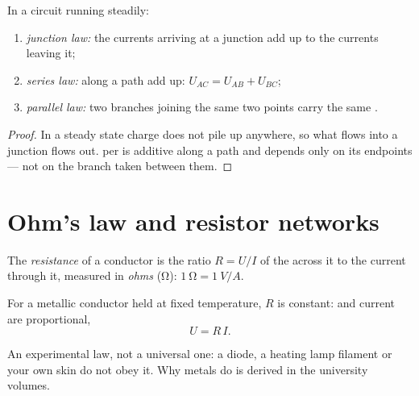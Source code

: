 \begin{proposition}\label{prop:g11:circuits-and-power:laws}
In a circuit running steadily:
\begin{enumerate}
  \item \emph{junction law:} the currents arriving at a junction add up
        to the currents leaving it;
  \item \emph{series law:}  along a path add up:
        $U_{AC} = U_{AB} + U_{BC}$;
  \item \emph{parallel law:} two branches joining the same two points
        carry the same .
\end{enumerate}
\end{proposition}

\begin{proof}
In a steady state charge does not pile up anywhere, so what flows into a
junction flows out.  per  is additive along a path and
depends only on its endpoints --- not on the branch taken between them.
\end{proof}

\section{Ohm's law and resistor networks}

\begin{definition}[Resistance]\label{def:g11:circuits-and-power:resistance}
The \emph{resistance} of a conductor is the ratio
$R = U/I$ of the  across it to the current through it, measured in
\emph{ohms} (\unit{\ohm}): $\qty{1}{\ohm} = \qty{1}{V/A}$.
\end{definition}

\begin{proposition}\label{prop:g11:circuits-and-power:ohm}
For a metallic conductor held at fixed temperature, $R$ is constant:
 and current are proportional,
\[ U = R\,I . \]
\end{proposition}
\admitted

\begin{remark}\label{rem:g11:circuits-and-power:ohm-limits}
An experimental law, not a universal one: a diode, a heating lamp
filament or your own skin do not obey it. Why metals do is derived in the
university volumes.
\end{remark}

